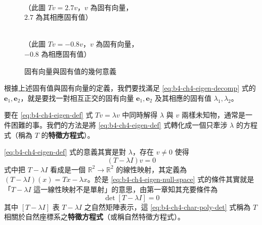 \begin{figure}[htbp]
\centering
\begin{minipage}{0.48\textwidth}
\centering
{}
\\[4pt]
\small （此圖 $Tv = 2.7v$，$v$ 為固有向量，\\ \small $2.7$ 為其相應固有值）
\end{minipage}
\hfill
\begin{minipage}{0.48\textwidth}
\centering
{}
\\[4pt]
\small （此圖 $Tv = -0.8v$，$v$ 為固有向量，\\ \small $-0.8$ 為相應固有值）
\end{minipage}
\caption{固有向量與固有值的幾何意義}
\label{fig:b4-ch4-fig2-2}
\end{figure}

根據上述固有值與固有向量的定義，我們要找滿足 \eqref{eq:b4-ch4-eigen-decomp} 式的 $\mathbf{e}_1, \mathbf{e}_2$，就是要找一對相互正交的固有向量 $\mathbf{e}_1, \mathbf{e}_2$ 及其相應的固有值 $\lambda_1, \lambda_2$。

要在 \eqref{eq:b4-ch4-eigen-def} 式 $Tv = \lambda v$ 中同時解得 $\lambda$ 與 $v$ 兩樣未知物，通常是一件困難的事。我們的方法是將 \eqref{eq:b4-ch4-eigen-def} 式轉化成一個只牽涉 $\lambda$ 的方程式（稱為 $T$ 的\textbf{特徵方程式}）。

\eqref{eq:b4-ch4-eigen-def} 式的意義其實是對 $\lambda$，存在 $v \ne 0$ 使得
\begin{equation}
(T - \lambda I)v = 0
\label{eq:b4-ch4-eigen-null-space}
\end{equation}
式中把 $T - \lambda I$ 看成是一個 $\mathbb{R}^2 \to \mathbb{R}^2$ 的線性映射，其定義為 $(T - \lambda I)(x) = Tx - \lambda x$。於是 \eqref{eq:b4-ch4-eigen-null-space} 式的條件其實就是「$T - \lambda I$ 這一線性映射不是單射」的意思，由第一章知其充要條件為
\begin{equation}
\det[T - \lambda I] = 0
\label{eq:b4-ch4-char-poly-det}
\end{equation}
其中 $[T - \lambda I]$ 表 $T - \lambda I$ 之自然矩陣表示，這 \eqref{eq:b4-ch4-char-poly-det} 式稱為 $T$ 相關於自然座標系之\textbf{特徵方程式}（或稱自然特徵方程式）。

